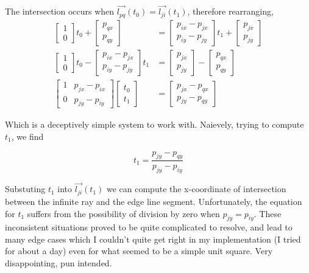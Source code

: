 \documentclass{article}
\begin{document}
The intersection occurs when $\vec{l_{pq}}(t_0) = \vec{l_{ji}}(t_1)$, therefore rearranging, 
\begin{align*}
\begin{bmatrix} 1 \\ 0 \end{bmatrix} t_0 + \begin{bmatrix} p_{qx} \\ p_{qy} \end{bmatrix} &= \begin{bmatrix} p_{ix} - p_{jx} \\ p_{iy} - p_{jy} \end{bmatrix} t_1 + \begin{bmatrix} p_{jx} \\ p_{jy} \end{bmatrix} \\
\begin{bmatrix} 1 \\ 0 \end{bmatrix} t_0 - \begin{bmatrix} p_{ix} - p_{jx} \\ p_{iy} - p_{jy} \end{bmatrix} t_1 &= \begin{bmatrix} p_{jx} \\ p_{jy} \end{bmatrix} - \begin{bmatrix} p_{qx} \\ p_{qy} \end{bmatrix} \\
\begin{bmatrix} 1 & p_{jx} - p_{ix} \\ 0 & p_{jy} - p_{iy} \end{bmatrix} \begin{bmatrix} t_0 \\ t_1 \end{bmatrix} &= \begin{bmatrix} p_{jx} - p_{qx} \\ p_{jy} - p_{qy} \end{bmatrix}
\end{align*}

Which is a deceptively simple system to work with. Naievely, trying to compute $t_1$, we find

\begin{equation}
t_1 = \frac{p_{jy} - p_{qy}}{p_{jy} - p_{iy}}
\end{equation}

Substuting $t_1$ into $\vec{l_{ji}}(t_1)$ we can compute the x-coordinate of intersection between the infinite ray and the edge line segment. Unfortunately, the equation for $t_1$ suffers from the possibility of division by zero when $p_{jy} = p_{iy}$. These inconsistent situations proved to be quite complicated to resolve, and lead to many edge cases which I couldn't quite get right in my implementation (I tried for about a day) even for what seemed to be a simple unit square. Very disappointing, pun intended.
\end{document}
